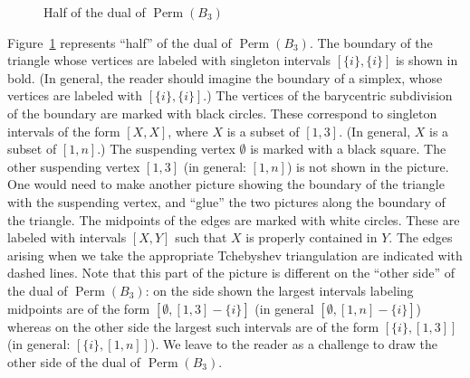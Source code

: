 \documentclass[reqno,12pt]{amsart}
\numberwithin{equation}{section}
\newcommand{\0}{\widehat{0}}
\newcommand{\1}{\widehat{1}}
\newcommand{\2}{\widehat{2}}
\begin{document}
\begin{figure}[h]
  
\caption{Half of the dual of $\operatorname{Perm}(B_{3})$}  
\label{fig:typebdual}
\end{figure}
Figure~\ref{fig:typebdual} represents ``half'' of the dual of
$\operatorname{Perm}(B_{3})$. The boundary of the triangle whose
vertices are labeled with singleton intervals $[\{i\},\{i\}]$ is shown
in bold. (In general, the reader should imagine the boundary of a
simplex, whose vertices are labeled with $[\{i\},\{i\}]$.) The vertices
of the barycentric subdivision of the boundary are marked with black
circles. These correspond to singleton intervals of the form $[X,X]$,
where $X$ is a subset of $[1,3]$. (In general, $X$ is a subset of $[1,n]$.)
The suspending vertex $\emptyset$ is marked with a black square. The
other suspending vertex $[1,3]$ (in general: $[1,n]$) is not shown in the
picture. One would need to make another picture showing the boundary of
the triangle with the suspending vertex, and ``glue'' the two pictures
along the boundary of the triangle. The midpoints of the edges are
marked with white circles. These are labeled with intervals $[X,Y]$ such
that $X$ is properly contained in $Y$. The edges arising when we take
the appropriate Tchebyshev triangulation are indicated with dashed
lines. Note that this part of the picture is different on the ``other
side'' of the dual of $\operatorname{Perm}(B_{3})$: on the side shown
the largest intervals labeling midpoints are of the form $[\emptyset,
  [1,3]-\{i\}]$ (in general $[\emptyset, [1,n]-\{i\}]$) whereas on the other
side the largest such intervals are of the form $[\{i\}, [1,3]]$ (in
general: $[\{i\}, [1,n]]$). We leave to the reader as a challenge to draw
the other side of the dual of $\operatorname{Perm}(B_{3})$.     
\end{document}
